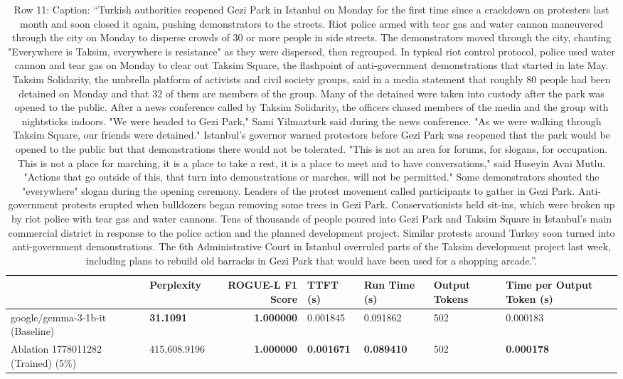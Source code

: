 \begin{table}[H]
\centering
\caption{Row 11: Caption: ``Turkish authorities reopened Gezi Park in Istanbul on Monday for the first time since a crackdown on protesters last month and soon closed it again, pushing demonstrators to the streets. Riot police armed with tear gas and water cannon maneuvered through the city on Monday to disperse crowds of 30 or more people in side streets. The demonstrators moved through the city, chanting "Everywhere is Taksim, everywhere is resistance" as they were dispersed, then regrouped. In typical riot control protocol, police used water cannon and tear gas on Monday to clear out Taksim Square, the flashpoint of anti-government demonstrations that started in late May. Taksim Solidarity, the umbrella platform of activists and civil society groups, said in a media statement that roughly 80 people had been detained on Monday and that 32 of them are members of the group. Many of the detained were taken into custody after the park was opened to the public. After a news conference called by Taksim Solidarity, the officers chased members of the media and the group with nightsticks indoors. "We were headed to Gezi Park," Sami Yilmazturk said during the news conference. "As we were walking through Taksim Square, our friends were detained." Istanbul's governor warned protestors before Gezi Park was reopened that the park would be opened to the public but that demonstrations there would not be tolerated. "This is not an area for forums, for slogans, for occupation. This is not a place for marching, it is a place to take a rest, it is a place to meet and to have conversations," said Huseyin Avni Mutlu. "Actions that go outside of this, that turn into demonstrations or marches, will not be permitted." Some demonstrators shouted the "everywhere" slogan during the opening ceremony. Leaders of the protest movement called participants to gather in Gezi Park. Anti-government protests erupted when bulldozers began removing some trees in Gezi Park. Conservationists held sit-ins, which were broken up by riot police with tear gas and water cannons. Tens of thousands of people poured into Gezi Park and Taksim Square in Istanbul's main commercial district in response to the police action and the planned development project. Similar protests around Turkey soon turned into anti-government demonstrations. The 6th Administrative Court in Istanbul overruled parts of the Taksim development project last week, including plans to rebuild old barracks in Gezi Park that would have been used for a shopping arcade.''.}
\label{tab:evaluation-pipeline-11}
\begin{tabular}{llrllll}
\toprule
 & Perplexity & ROGUE-L F1 Score & TTFT (s) & Run Time (s) & Output Tokens & Time per Output Token (s) \\
\midrule
google/gemma-3-1b-it (Baseline) & \bfseries 31.1091 & \bfseries 1.000000 & 0.001845 & 0.091862 & 502 & 0.000183 \\
Ablation 1778011282 (Trained) (5\%) & \color{red} 415,608.9196 & \bfseries \color{red} 1.000000 & \bfseries \color{red} 0.001671 & \bfseries \color{red} 0.089410 & \color{red} 502 & \bfseries \color{red} 0.000178 \\
\bottomrule
\end{tabular}
\end{table}
